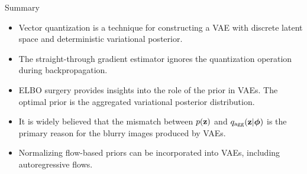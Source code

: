 \documentclass{beamer}
\begin{document}
\begin{frame}{Summary}
	\begin{itemize}
		\item Vector quantization is a technique for constructing a VAE with discrete latent space and deterministic variational posterior. 
		\vfill
		\item The straight-through gradient estimator ignores the quantization operation during backpropagation.			
		\vfill
		\item ELBO surgery provides insights into the role of the prior in VAEs. The optimal prior is the aggregated variational posterior distribution. 
		\vfill
		\item It is widely believed that the mismatch between $p(\mathbf{z})$ and $q_{\text{agg}}(\mathbf{z} | \boldsymbol{\phi})$ is the primary reason for the blurry images produced by VAEs.
		\vfill
		\item Normalizing flow-based priors can be incorporated into VAEs, including autoregressive flows.	
	\end{itemize}
\end{frame}
\end{document}
